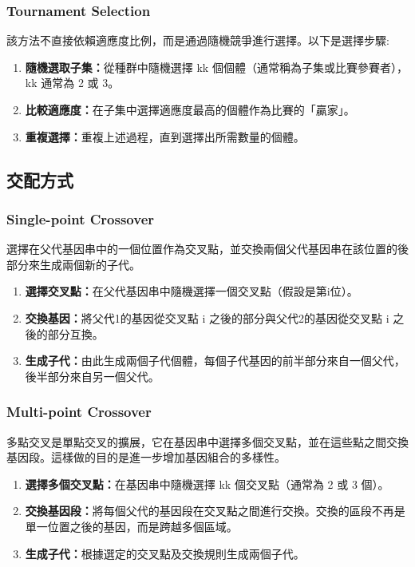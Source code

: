 \subsubsection{Tournament Selection}
該方法不直接依賴適應度比例，而是通過隨機競爭進行選擇。以下是選擇步驟:
\begin{enumerate}
    \item \textbf{隨機選取子集：}從種群中隨機選擇 kk 個個體（通常稱為子集或比賽參賽者）， kk 通常為 2 或 3。
    \item \textbf{比較適應度：}在子集中選擇適應度最高的個體作為比賽的「贏家」。
    \item \textbf{重複選擇：}重複上述過程，直到選擇出所需數量的個體。
\end{enumerate}

\subsection{交配方式}
\subsubsection{Single-point Crossover}
選擇在父代基因串中的一個位置作為交叉點，並交換兩個父代基因串在該位置的後部分來生成兩個新的子代。
\begin{enumerate}
    \item \textbf{選擇交叉點：}在父代基因串中隨機選擇一個交叉點（假設是第i位）。
    \item \textbf{交換基因：}將父代1的基因從交叉點 i 之後的部分與父代2的基因從交叉點 i 之後的部分互換。
    \item \textbf{生成子代：}由此生成兩個子代個體，每個子代基因的前半部分來自一個父代，後半部分來自另一個父代。
\end{enumerate}
\subsubsection{Multi-point Crossover}
多點交叉是單點交叉的擴展，它在基因串中選擇多個交叉點，並在這些點之間交換基因段。這樣做的目的是進一步增加基因組合的多樣性。
\begin{enumerate}
    \item \textbf{選擇多個交叉點：}在基因串中隨機選擇 kk 個交叉點（通常為 2 或 3 個）。
    \item \textbf{交換基因段：}將每個父代的基因段在交叉點之間進行交換。交換的區段不再是單一位置之後的基因，而是跨越多個區域。
    \item \textbf{生成子代：}根據選定的交叉點及交換規則生成兩個子代。
\end{enumerate}



